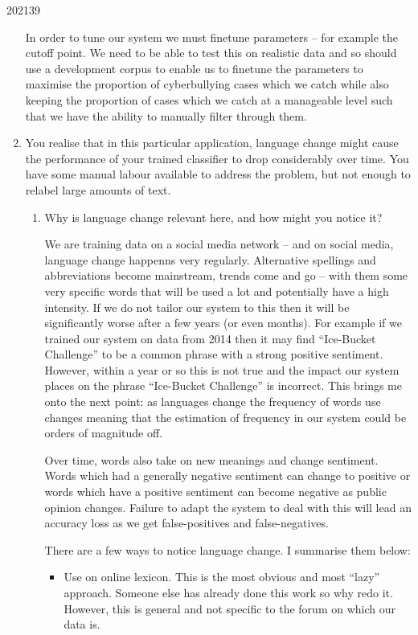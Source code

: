 \documentclass[10pt,\jkfside,a4paper]{article}
\begin{document}
\begin{examquestion}{2021}{3}{9}
\begin{enumerate}
In order to tune our system we must finetune parameters -- for example the cutoff point.
We need to be able to test this on realistic data and so should use a development corpus to 
enable us to finetune the parameters to maximise the proportion of cyberbullying cases which 
we catch while also keeping the proportion of cases which we catch at a manageable level such 
that we have the ability to manually filter through them.

\item You realise that in this particular application, language change might cause the
performance of your trained classifier to drop considerably over time. You have
some manual labour available to address the problem, but not enough to relabel
large amounts of text.

\begin{enumerate}

\item Why is language change relevant here, and how might you notice it?

We are training data on a social media network -- and on social media, language change 
happenns very regularly. Alternative spellings and abbreviations become mainstream, trends come and go -- with 
them some very specific words that will be used a lot and potentially have a high intensity. 
If we do not tailor our system to this then it will be significantly worse after a few years 
(or even months). For example if we trained our system on data from 2014 then it may find 
``Ice-Bucket Challenge'' to be a common phrase with a strong positive sentiment. However, within 
a year or so this is not true and the impact our system places on the phrase ``Ice-Bucket Challenge'' 
is incorrect. This brings me onto the next point: as languages change the frequency of words use changes meaning 
that the estimation of frequency in our system could be orders of magnitude off.

Over time, words also take on new meanings and change sentiment. Words which had a generally negative 
sentiment can change to positive or words which have a positive sentiment can become negative as public 
opinion changes. Failure to adapt the system to deal with this will lead an accuracy loss as we get 
false-positives and false-negatives.

There are a few ways to notice language change. I summarise them below:

\begin{itemize}

\item Use on online lexicon. This is the most obvious and most ``lazy'' approach. Someone else has 
already done this work so why redo it. However, this is general and not specific to the forum on which 
our data is.


\end{itemize}
\end{enumerate}
\end{enumerate}
\end{examquestion}
\end{document}
